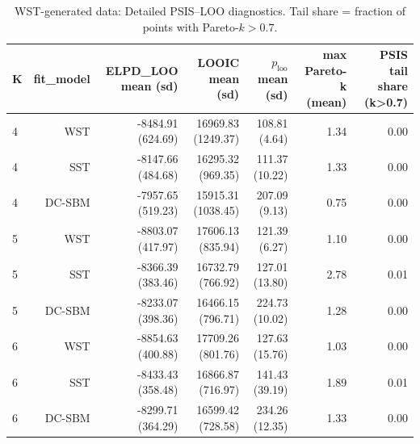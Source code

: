 \begin{table}[!h]
\centering
\caption{WST-generated data: Detailed PSIS–LOO diagnostics. Tail share = fraction of points with Pareto-\(k>0.7\).\\\label{tab:wst-appx-psis}}
\centering
\begin{tabular}[t]{lrrrrrr}
\toprule
K & fit_model & ELPD\_LOO mean (sd) & LOOIC mean (sd) & $p_{\text{loo}}$ mean (sd) & max Pareto-k (mean) & PSIS tail share (k>0.7)\\
\midrule
4 & WST & -8484.91 (624.69) & 16969.83 (1249.37) & 108.81 (4.64) & 1.34 & 0.00\\
4 & SST & -8147.66 (484.68) & 16295.32 (969.35) & 111.37 (10.22) & 1.33 & 0.00\\
4 & DC-SBM & -7957.65 (519.23) & 15915.31 (1038.45) & 207.09 (9.13) & 0.75 & 0.00\\
5 & WST & -8803.07 (417.97) & 17606.13 (835.94) & 121.39 (6.27) & 1.10 & 0.00\\
5 & SST & -8366.39 (383.46) & 16732.79 (766.92) & 127.01 (13.80) & 2.78 & 0.01\\
5 & DC-SBM & -8233.07 (398.36) & 16466.15 (796.71) & 224.73 (10.02) & 1.28 & 0.00\\
6 & WST & -8854.63 (400.88) & 17709.26 (801.76) & 127.63 (15.76) & 1.03 & 0.00\\
6 & SST & -8433.43 (358.48) & 16866.87 (716.97) & 141.43 (39.19) & 1.89 & 0.01\\
6 & DC-SBM & -8299.71 (364.29) & 16599.42 (728.58) & 234.26 (12.35) & 1.33 & 0.00\\
\bottomrule
\end{tabular}
\end{table}
